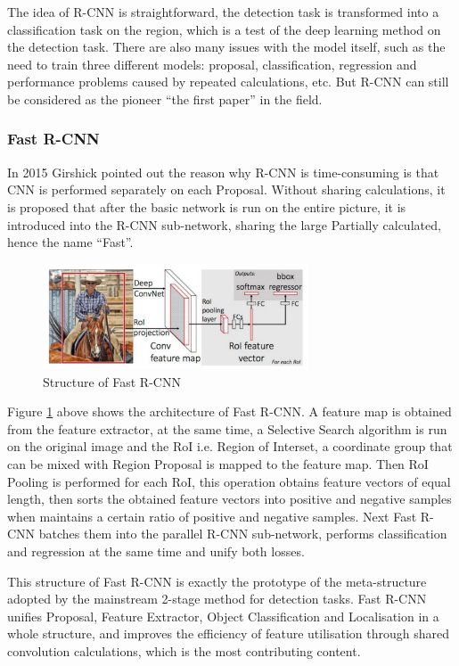 The idea of R-CNN is straightforward, the detection task is transformed into a classification task on the region, which is a test of the deep learning method on the detection task. There are also many issues with the model itself, such as the need to train three different models: proposal, classification, regression and performance problems caused by repeated calculations, etc. But R-CNN can still be considered as the pioneer ``the first paper'' in the field.

\subsubsection{Fast R-CNN}
In 2015 Girshick \cite{fastrcnn} pointed out the reason why R-CNN is time-consuming is that CNN is performed separately on each Proposal. Without sharing calculations, it is proposed that after the basic network is run on the entire picture, it is introduced into the R-CNN sub-network, sharing the large Partially calculated, hence the name ``Fast''.

\begin{figure}[h!]
\centering
\includegraphics[width=0.7\textwidth]{fastrcnn.pdf}
\caption{Structure of Fast R-CNN \cite{fastrcnn}}
\label{fig:fastrcnn}
\end{figure}

Figure \ref{fig:fastrcnn} above shows the architecture of Fast R-CNN. A feature map is obtained from the feature extractor, at the same time, a Selective Search algorithm is run on the original image and the RoI i.e. Region of Interset, a coordinate group that can be mixed with Region Proposal is mapped to the feature map. Then RoI Pooling is performed for each RoI, this operation obtains feature vectors of equal length, then sorts the obtained feature vectors into positive and negative samples when maintains a certain ratio of positive and negative samples. Next Fast R-CNN batches them into the parallel R-CNN sub-network, performs classification and regression at the same time and unify both losses.

This structure of Fast R-CNN is exactly the prototype of the meta-structure adopted by the mainstream 2-stage method for detection tasks. Fast R-CNN \cite{fastrcnn} unifies Proposal, Feature Extractor, Object Classification and Localisation in a whole structure, and improves the efficiency of feature utilisation through shared convolution calculations, which is the most contributing content.

